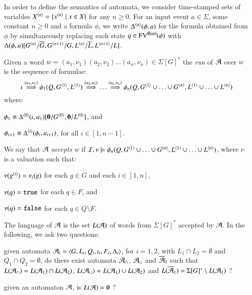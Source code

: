 \documentclass{llncs}
\begin{document}
In order to define the semantics of automata, we consider time-stamped
sets of variables ${X}^{\left\langle n \right\rangle} = \{{x}^{\left\langle n \right\rangle} \mid x \in X\}$ for
any $n\geq0$. For an input event $a \in \Sigma$, some constant
$n\geq0$ and a formula $\phi$, we write ${\Delta}^{\left\langle n \right\rangle}(\phi,a)$
for the formula obtained from $\phi$ by simultaneously replacing each
state $q \in \mathrm{FV}^{\mathsf{Bool}}(\phi)$ with
$\Delta(\phi,a)[{G}^{\left\langle n \right\rangle}/\overline{G}, {G}^{\left\langle n+1 \right\rangle}/G,
  {L}^{\left\langle n \right\rangle}/\overline{L}, {L}^{\left\langle n+1 \right\rangle}/L]$.

Given a word $w = (a_1,\nu_1)(a_2,\nu_2) \ldots (a_n,\nu_n) \in
\Sigma[G]^*$ the \emph{run} of $\mathcal{A}$ over $w$ is the sequence of
formulae: \[\iota \stackrel{(a_1,\nu_1)}{\Longrightarrow}
\phi_1(Q,{G}^{\left\langle 1 \right\rangle},
{L}^{\left\langle 1 \right\rangle}) \stackrel{(a_2,\nu_2)}{\Longrightarrow} \ldots
\stackrel{(a_n,\nu_n)}{\Longrightarrow} \phi_n(Q,{G}^{\left\langle 1 \right\rangle} \cup
\ldots \cup {G}^{\left\langle n \right\rangle}, {L}^{\left\langle 1 \right\rangle} \cup \ldots \cup
{L}^{\left\langle n \right\rangle})\] where: \begin{compactitem}
\item $\phi_1 \equiv {\Delta}^{\left\langle 0 \right\rangle}(\iota,a_1)[\mathbf{0}/{G}^{\left\langle 0 \right\rangle},\mathbf{0}/{L}^{\left\langle 0 \right\rangle}]$, and
%
\item $\phi_{i+1} \equiv {\Delta}^{\left\langle i \right\rangle}(\phi_i,a_{i+1})$, for all $i \in [1,n-1]$.
\end{compactitem}
We say that $\mathcal{A}$ \emph{accepts} $w$ if $\mathcal{I},\nu \models
\phi_n(Q,{G}^{\left\langle 1 \right\rangle} \cup \ldots \cup {G}^{\left\langle n \right\rangle}, {L}^{\left\langle 1 \right\rangle} \cup
\ldots \cup {L}^{\left\langle n \right\rangle})$, where $\nu$ is a valuation such
that: \begin{compactitem}
\item $\nu({g}^{\left\langle i \right\rangle}) = \nu_i(g)$ for each $g \in G$ and each $i \in [1,n]$, 
%
\item $\nu(q) = \mathtt{true}$ for each $q \in F$, and
%
\item $\nu(q) = \mathtt{false}$ for each $q \in Q \setminus F$.
\end{compactitem}
The language of $\mathcal{A}$ is the set $L(\mathcal{A})$ of words from $\Sigma[G]^*$
accepted by $\mathcal{A}$. In the following, we ask two
questions: \begin{compactenum}
\item given automata $\mathcal{A}_i = \left\langle G,L_i,Q_i,\iota_i,F_i,\Delta_i \right\rangle$,
  for $i=1,2$, with $L_1 \cap L_2 = \emptyset$ and $Q_1 \cap Q_2 =
  \emptyset$, do there exist automata $\mathcal{A}_\cap$, $\mathcal{A}_\cup$ and
  $\overline{\mathcal{A}}_1$ such that $L(\mathcal{A}_\cap) = L(\mathcal{A}_1) \cap L(\mathcal{A}_2)$,
  $L(\mathcal{A}_\cup) = L(\mathcal{A}_1) \cup L(\mathcal{A}_2)$ and $L(\overline{\mathcal{A}}_1) =
  \Sigma[G]^* \setminus L(\mathcal{A}_1)$ ?
%
\item given an automaton $\mathcal{A}$, is $L(\mathcal{A}) = \emptyset$ ? 
\end{compactenum}

\end{document}
